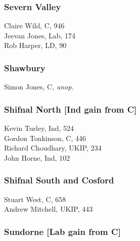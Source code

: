 \documentclass[a4paper,openany,10pt]{book}
\begin{document}
\subsubsection*{Severn Valley}



Claire Wild, C, 946\\
Jeevan Jones, Lab, 174\\
Rob Harper, LD, 90\\


\subsubsection*{Shawbury}



Simon Jones, C, \emph{unop.}\\


\subsubsection*{Shifnal North \hspace*{\fill}\nolinebreak[1]%
\enspace\hspace*{\fill}
[Ind gain from C]}



Kevin Turley, Ind, 524\\
Gordon Tonkinson, C, 446\\
Richard Choudhary, UKIP, 234\\
John Horne, Ind, 102\\


\subsubsection*{Shifnal South and Cosford}



Stuart West, C, 658\\
Andrew Mitchell, UKIP, 443\\


\subsubsection*{Sundorne \hspace*{\fill}\nolinebreak[1]%
\enspace\hspace*{\fill}
[Lab gain from C]}
\end{document}
